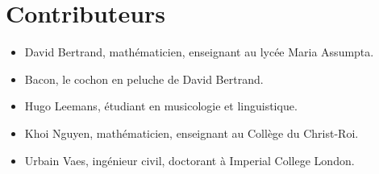 \section*{Contributeurs}

\begin{itemize}
    \item David Bertrand, mathématicien, enseignant au lycée Maria Assumpta.
    \item Bacon, le cochon en peluche de David Bertrand.
    \item Hugo Leemans, étudiant en musicologie et linguistique.
    \item Khoi Nguyen, mathématicien, enseignant au Collège du Christ-Roi.
    \item Urbain Vaes, ingénieur civil, doctorant à Imperial College London.
\end{itemize}
